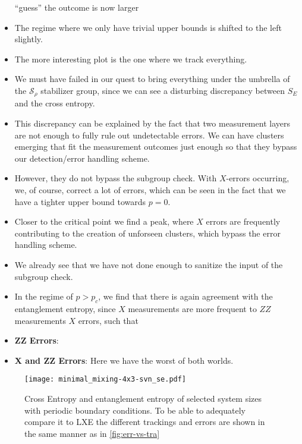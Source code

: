 \begin{itemize}
    \enquote{guess} the outcome is now larger
  \item The regime where we only have trivial upper bounds is shifted to the
    left slightly.
  \item The more interesting plot is the one where we track everything.
  \item We must have failed in our quest to bring everything under the umbrella
    of the $\mathcal{S}_\rho$ stabilizer group, since we can see a disturbing
    discrepancy between $S_E$ and the cross entropy.
  \item This discrepancy can be explained by the fact that two measurement
    layers are not enough to fully rule out undetectable errors. We can have
    clusters emerging that fit the measurement outcomes just enough so that
    they bypass our detection/error handling scheme.
  \item However, they do not bypass the subgroup check. With $X$-errors
    occurring, we, of course, correct a lot of errors, which can be seen in the
    fact that we have a tighter upper bound towards $p=0$.
  \item Closer to the critical point we find a peak, where $X$ errors are
    frequently contributing to the creation of unforseen clusters, which bypass
    the error handling scheme.
  \item We already see that we have not done enough to sanitize the input of
    the subgroup check.
  \item In the regime of $p > p_c$, we find that there is again agreement with
    the entanglement entropy, since $X$ measurements are more frequent to $ZZ$
    measurements 
    $X$ errors, such that 
  \item \textbf{ZZ Errors}:
  \item \textbf{X and ZZ Errors}: Here we have the worst of both worlds. 
\end{itemize}

\begin{figure}[p]
  \centering
  \texttt{[image: minimal\_mixing-4x3-svn\_se.pdf]}
  \caption{Cross Entropy and entanglement entropy of selected system sizes with
  periodic boundary conditions. To be able to adequately compare it to LXE the
different trackings and errors are shown in the same manner as in
\cref{fig:err-vs-tra}}
  \label{fig:min_mix-svn_se-4x3}
\end{figure}

